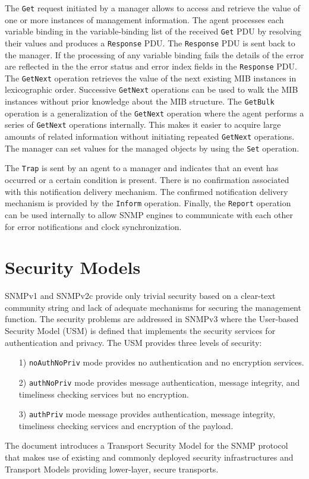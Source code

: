 The \texttt{Get} request initiated by a manager allows to access and retrieve the value of one or more instances of management information. The agent processes each variable binding in the variable-binding list of the received \texttt{Get} PDU by resolving their values and produces a \texttt{Response} PDU. The \texttt{Response} PDU is sent back to the manager. If the processing of any variable binding fails the details of the error are reflected in the the error status and error index fields in the \texttt{Response} PDU. The \texttt{GetNext} operation retrieves the value of the next existing MIB instances in lexicographic order. Successive \texttt{GetNext} operations can be used to walk the MIB instances without prior knowledge about the MIB structure. The \texttt{GetBulk} operation is a generalization of the \texttt{GetNext} operation where the agent performs a series of \texttt{GetNext} operations internally. This makes it easier to acquire large amounts of related information without initiating repeated \texttt{GetNext} operations. The manager can set values for the managed objects by using the \texttt{Set} operation.

The \texttt{Trap} is sent by an agent to a manager and indicates that an event has occurred or a certain condition is present. There is no confirmation associated with this notification delivery mechanism. The confirmed notification delivery mechanism is provided by the \texttt{Inform} operation. Finally, the \texttt{Report} operation can be used internally to allow SNMP engines to communicate with each other for error notifications and clock synchronization.

\section{Security Models}
SNMPv1 and SNMPv2c  provide only trivial security based on a clear-text community string and lack of adequate mechanisms for securing the management function. The security problems are addressed in SNMPv3 where the User-based Security Model (USM) \cite{rfc3414} is defined that implements the security services for authentication and privacy. The USM provides three levels of security:
\begin{enumerate}
\item[1)] \texttt{noAuthNoPriv} mode provides no authentication and no encryption services.
\item[2)] \texttt{authNoPriv} mode provides message authentication, message integrity, and timeliness checking services but no encryption.
\item[3)] \texttt{authPriv} mode message provides authentication, message integrity, timeliness checking services and encryption of the payload.
\end{enumerate} 

The document \cite{rfc5591} introduces a Transport Security Model for the SNMP protocol that makes use of existing and commonly deployed security infrastructures and Transport Models providing lower-layer, secure transports. 

